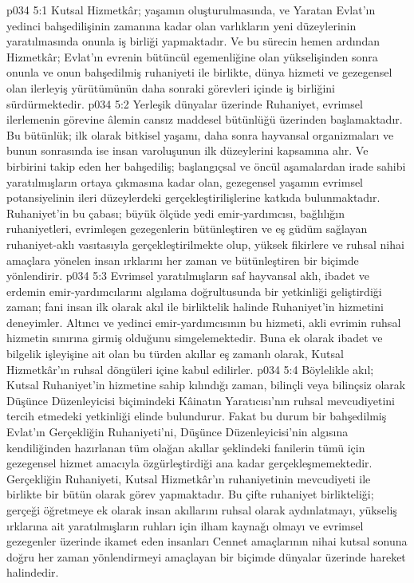 \vs p034 5:1 Kutsal Hizmetkâr; yaşamın oluşturulmasında, ve Yaratan Evlat’ın yedinci bahşedilişinin zamanına kadar olan varlıkların yeni düzeylerinin yaratılmasında onunla iş birliği yapmaktadır. Ve bu sürecin hemen ardından Hizmetkâr; Evlat’ın evrenin bütüncül egemenliğine olan yükselişinden sonra onunla ve onun bahşedilmiş ruhaniyeti ile birlikte, dünya hizmeti ve gezegensel olan ilerleyiş yürütümünün daha sonraki görevleri içinde iş birliğini sürdürmektedir.
\vs p034 5:2 Yerleşik dünyalar üzerinde Ruhaniyet, evrimsel ilerlemenin görevine âlemin cansız maddesel bütünlüğü üzerinden başlamaktadır. Bu bütünlük; ilk olarak bitkisel yaşamı, daha sonra hayvansal organizmaları ve bunun sonrasında ise insan varoluşunun ilk düzeylerini kapsamına alır. Ve birbirini takip eden her bahşediliş; başlangıçsal ve öncül aşamalardan irade sahibi yaratılmışların ortaya çıkmasına kadar olan, gezegensel yaşamın evrimsel potansiyelinin ileri düzeylerdeki gerçekleştirilişlerine katkıda bulunmaktadır. Ruhaniyet’in bu çabası; büyük ölçüde yedi emir\hyp{}yardımcısı, bağlılığın ruhaniyetleri, evrimleşen gezegenlerin bütünleştiren ve eş güdüm sağlayan ruhaniyet\hyp{}aklı vasıtasıyla gerçekleştirilmekte olup, yüksek fikirlere ve ruhsal nihai amaçlara yönelen insan ırklarını her zaman ve bütünleştiren bir biçimde yönlendirir.
\vs p034 5:3 Evrimsel yaratılmışların saf hayvansal aklı, ibadet ve erdemin emir\hyp{}yardımcılarını algılama doğrultusunda bir yetkinliği geliştirdiği zaman; fani insan ilk olarak akıl ile birliktelik halinde Ruhaniyet’in hizmetini deneyimler. Altıncı ve yedinci emir\hyp{}yardımcısının bu hizmeti, akli evrimin ruhsal hizmetin sınırına girmiş olduğunu simgelemektedir. Buna ek olarak ibadet ve bilgelik işleyişine ait olan bu türden akıllar eş zamanlı olarak, Kutsal Hizmetkâr’ın ruhsal döngüleri içine kabul edilirler.
\vs p034 5:4 Böylelikle akıl; Kutsal Ruhaniyet’in hizmetine sahip kılındığı zaman, bilinçli veya bilinçsiz olarak Düşünce Düzenleyicisi biçimindeki Kâinatın Yaratıcısı’nın ruhsal mevcudiyetini tercih etmedeki yetkinliği elinde bulundurur. Fakat bu durum bir bahşedilmiş Evlat’ın Gerçekliğin Ruhaniyeti’ni, Düşünce Düzenleyicisi’nin algısına kendiliğinden hazırlanan tüm olağan akıllar şeklindeki fanilerin tümü için gezegensel hizmet amacıyla özgürleştirdiği ana kadar gerçekleşmemektedir. Gerçekliğin Ruhaniyeti, Kutsal Hizmetkâr’ın ruhaniyetinin mevcudiyeti ile birlikte bir bütün olarak görev yapmaktadır. Bu çifte ruhaniyet birlikteliği; gerçeği öğretmeye ek olarak insan akıllarını ruhsal olarak aydınlatmayı, yükseliş ırklarına ait yaratılmışların ruhları için ilham kaynağı olmayı ve evrimsel gezegenler üzerinde ikamet eden insanları Cennet amaçlarının nihai kutsal sonuna doğru her zaman yönlendirmeyi amaçlayan bir biçimde dünyalar üzerinde hareket halindedir.
